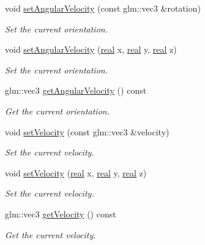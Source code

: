 \begin{DoxyCompactItemize}
void \mbox{\hyperlink{classr3_1_1_rigid_body_af3fe9bbb0f1eda401c2a5cd02c915600}{set\+Angular\+Velocity}} (const glm\+::vec3 \&rotation)
\begin{DoxyCompactList}\small\item\em Set the current orientation. \end{DoxyCompactList}\item 
void \mbox{\hyperlink{classr3_1_1_rigid_body_a9b53314d9cc1a1dc26b9cc3312668b49}{set\+Angular\+Velocity}} (\mbox{\hyperlink{namespacer3_ab2016b3e3f743fb735afce242f0dc1eb}{real}} x, \mbox{\hyperlink{namespacer3_ab2016b3e3f743fb735afce242f0dc1eb}{real}} y, \mbox{\hyperlink{namespacer3_ab2016b3e3f743fb735afce242f0dc1eb}{real}} z)
\begin{DoxyCompactList}\small\item\em Set the current orientation. \end{DoxyCompactList}\item 
glm\+::vec3 \mbox{\hyperlink{classr3_1_1_rigid_body_a0d60576d3d08d10cd529306a3a5888d7}{get\+Angular\+Velocity}} () const
\begin{DoxyCompactList}\small\item\em Get the current orientation. \end{DoxyCompactList}\item 
void \mbox{\hyperlink{classr3_1_1_rigid_body_a033bf2bf8e128b5438fdd91f7d29c051}{set\+Velocity}} (const glm\+::vec3 \&velocity)
\begin{DoxyCompactList}\small\item\em Set the current velocity. \end{DoxyCompactList}\item 
void \mbox{\hyperlink{classr3_1_1_rigid_body_a244d24ec2368098f4ac38603a982ea54}{set\+Velocity}} (\mbox{\hyperlink{namespacer3_ab2016b3e3f743fb735afce242f0dc1eb}{real}} x, \mbox{\hyperlink{namespacer3_ab2016b3e3f743fb735afce242f0dc1eb}{real}} y, \mbox{\hyperlink{namespacer3_ab2016b3e3f743fb735afce242f0dc1eb}{real}} z)
\begin{DoxyCompactList}\small\item\em Set the current velocity. \end{DoxyCompactList}\item 
glm\+::vec3 \mbox{\hyperlink{classr3_1_1_rigid_body_a17b3c0a13865cdca6e43037ec7107d58}{get\+Velocity}} () const
\begin{DoxyCompactList}\small\item\em Get the current velocity. \end{DoxyCompactList}\item 

\end{DoxyCompactItemize}
